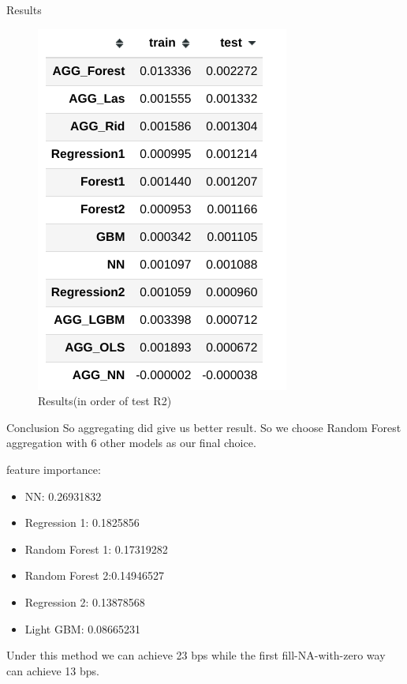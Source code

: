 \documentclass{beamer}
\begin{document}
\begin{frame}{Results}
    \begin{figure}[ht]
        \centering
        \includegraphics[width=0.7\linewidth,height=0.7\linewidth]{agg_2.png}
        \caption{Results(in order of test R2)}
        \label{fig:label}
    \end{figure}
\end{frame}

\begin{frame}{Conclusion}
    So aggregating did give us better result. So we choose Random Forest aggregation with 6 other models as our final choice.

    feature importance:
    \begin{itemize}
        \item NN: 0.26931832
        \item Regression 1: 0.1825856
        \item Random Forest 1: 0.17319282
        \item Random Forest 2:0.14946527
        \item Regression 2: 0.13878568
        \item Light GBM: 0.08665231
    \end{itemize}

Under this method we can achieve 23 bps while the first fill-NA-with-zero way can achieve 13 bps.
\end{frame}
\end{document}
